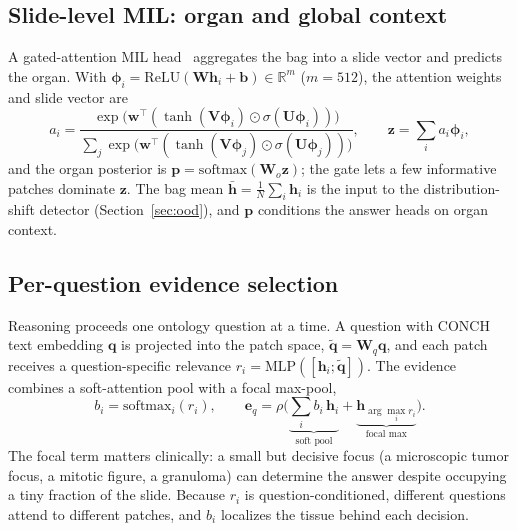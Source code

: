 \documentclass[runningheads]{llncs}
\begin{document}
\subsection{Slide-level MIL: organ and global context}
A gated-attention MIL head~\cite{abmil} aggregates the bag into a slide vector and predicts the organ. With
$\boldsymbol{\phi}_i=\mathrm{ReLU}(\mathbf{W}\mathbf{h}_i+\mathbf{b})\in\mathbb{R}^{m}$ ($m{=}512$), the
attention weights and slide vector are
\begin{equation}
a_i=\frac{\exp\!\big(\mathbf{w}^{\!\top}(\tanh(\mathbf{V}\boldsymbol{\phi}_i)\odot\sigma(\mathbf{U}\boldsymbol{\phi}_i))\big)}
{\sum_j \exp\!\big(\mathbf{w}^{\!\top}(\tanh(\mathbf{V}\boldsymbol{\phi}_j)\odot\sigma(\mathbf{U}\boldsymbol{\phi}_j))\big)},
\qquad \mathbf{z}=\sum_i a_i\boldsymbol{\phi}_i ,
\end{equation}
and the organ posterior is $\mathbf{p}=\mathrm{softmax}(\mathbf{W}_o\mathbf{z})$; the gate lets a few informative
patches dominate $\mathbf{z}$. The bag mean $\bar{\mathbf{h}}=\tfrac1N\sum_i\mathbf{h}_i$ is the input to the distribution-shift
detector (Section~\ref{sec:ood}), and $\mathbf{p}$ conditions the answer heads on organ context.

\subsection{Per-question evidence selection}
\label{sec:qcp}
Reasoning proceeds one ontology question at a time. A question with CONCH text embedding $\mathbf{q}$ is
projected into the patch space, $\tilde{\mathbf{q}}=\mathbf{W}_q\mathbf{q}$, and each patch receives a
question-specific relevance $r_i=\mathrm{MLP}([\mathbf{h}_i;\tilde{\mathbf{q}}])$. The evidence combines a
soft-attention pool with a focal max-pool,
\begin{equation}
b_i=\mathrm{softmax}_i(r_i), \qquad
\mathbf{e}_q=\rho\!\Big(\underbrace{\textstyle\sum_i b_i\,\mathbf{h}_i}_{\text{soft pool}}
+\underbrace{\mathbf{h}_{\arg\max_i r_i}}_{\text{focal max}}\Big).
\end{equation}
The focal term matters clinically: a small but decisive focus (a microscopic tumor focus, a mitotic figure, a
granuloma) can determine the answer despite occupying a tiny fraction of the slide. Because $r_i$ is
question-conditioned, different questions attend to different patches, and $b_i$ localizes the tissue behind each
decision.
\end{document}

